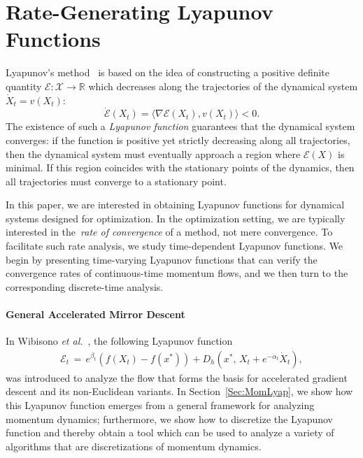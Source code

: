 \documentclass[11pt]{article}
\theoremstyle{plain}
\newcommand{\R}{{\mathbb R}}
\newcommand{\E}{{\mathcal E}}
\newcommand{\X}{{\mathcal X}}
\begin{document}
\section{Rate-Generating Lyapunov Functions}
Lyapunov's method~\cite{Lyapunov} is based on the idea of constructing a positive definite quantity $\E: \X \rightarrow \R$ which decreases along the trajectories of the dynamical system $\dot X_t = v(X_t)$:
\begin{equation*}
\dot \E(X_t) =\langle \nabla \E(X_t), v(X_t)\rangle < 0.
\end{equation*}
The existence of such a \emph{Lyapunov function} guarantees that the dynamical system converges: if the function is positive yet strictly decreasing along all trajectories, then the dynamical system must eventually approach a region where $\E(X)$ is minimal.  If this region coincides with the stationary points of the dynamics, then all trajectories must converge to a stationary point.

In this paper, we are interested in obtaining Lyapunov functions for dynamical systems designed for optimization.  In the optimization setting, we are typically interested in the~\emph{rate of convergence} of a method, not mere convergence.  To facilitate such rate analysis, we study time-dependent Lyapunov functions.  We begin by presenting time-varying Lyapunov functions that can verify the convergence rates of continuous-time momentum flows, and we then turn to the corresponding discrete-time analysis.

\paragraph{General Accelerated Mirror Descent} In Wibisono {\em et al.}~\cite{Acceleration}, the following Lyapunov function 
\begin{align}\label{Eq:E}
\E_t \,=\, e^{\beta_t} (f(X_t)-f(x^*)) + D_h\left(x^*, \, X_t + e^{-\alpha_t} \dot X_t\right),
\end{align}
was introduced to analyze the flow that forms the basis for accelerated gradient descent and its non-Euclidean variants.
In Section~\ref{Sec:MomLyap}, we show how this Lyapunov function emerges from a general framework for analyzing momentum dynamics; furthermore, we show how to discretize the Lyapunov function and thereby obtain a tool which can be used to analyze a variety of algorithms that are discretizations of momentum dynamics.
%
%
%
\end{document}
